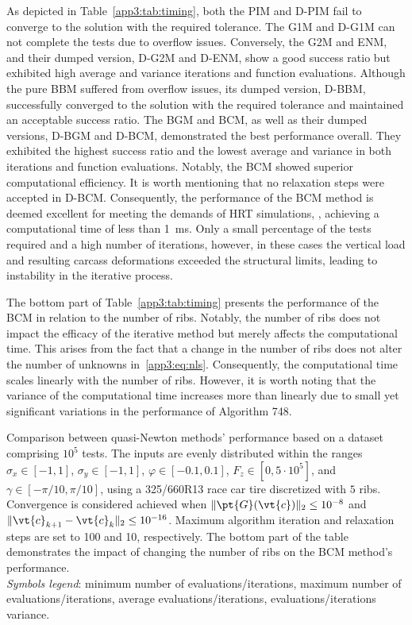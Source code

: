 As depicted in Table~\ref{app3:tab:timing}, both the PIM and D-PIM fail to converge to the solution with the required tolerance. The G1M and D-G1M can not complete the tests due to overflow issues. Conversely, the G2M and ENM, and their dumped version, D-G2M and D-ENM, show a good success ratio but exhibited high average and variance iterations and function evaluations. Although the pure BBM suffered from overflow issues, its dumped version, D-BBM, successfully converged to the solution with the required tolerance and maintained an acceptable success ratio. The BGM and BCM, as well as their dumped versions, D-BGM and D-BCM, demonstrated the best performance overall. They exhibited the highest success ratio and the lowest average and variance in both iterations and function evaluations. Notably, the BCM showed superior computational efficiency. It is worth mentioning that no relaxation steps were accepted in D-BCM. Consequently, the performance of the BCM method is deemed excellent for meeting the demands of \ac{HRT} simulations, \ie{}, achieving a computational time of less than \SI{1}{\milli\second}. Only a small percentage of the tests required and a high number of iterations, however, in these cases the vertical load and resulting carcass deformations exceeded the structural limits, leading to instability in the iterative process.

The bottom part of Table~\ref{app3:tab:timing} presents the performance of the BCM in relation to the number of ribs. Notably, the number of ribs does not impact the efficacy of the iterative method but merely affects the computational time. This arises from the fact that a change in the number of ribs does not alter the number of unknowns in~\eqref{app3:eq:nls}. Consequently, the computational time scales linearly with the number of ribs. However, it is worth noting that the variance of the computational time increases more than linearly due to small yet significant variations in the performance of Algorithm 748.

\begin{table}[htb]
  \centering
  \caption{Comparison between quasi-Newton methods' performance based on a dataset comprising $10^5$ tests. The inputs are evenly distributed within the ranges $\sigma_x \in [-1, 1]$, $\sigma_y \in [-1, 1]$, $\varphi \in [-0.1, 0.1]$, $F_z \in [0, 5\cdot10^5]$, and $\gamma \in [-\pi/10, \pi/10]$, using a 325/660R13 race car tire discretized with $5$ ribs. Convergence is considered achieved when $\|\pt{G}(\vt{c})\|_2 \le 10^{-8}$ and $\|\vt{c}_{k+1} - \vt{c}_{k}\|_2 \le 10^{-16}$. Maximum algorithm iteration and relaxation steps are set to 100 and 10, respectively. The bottom part of the table demonstrates the impact of changing the number of ribs on the BCM method's performance. \\
  \emph{Symbols legend}: \mini{} minimum number of evaluations/iterations, \maxi{} maximum number of evaluations/iterations, \meai{} average evaluations/iterations, \vari{} evaluations/iterations variance.
  }
  \label{app3:tab:timing}
  \small
  
\end{table}

